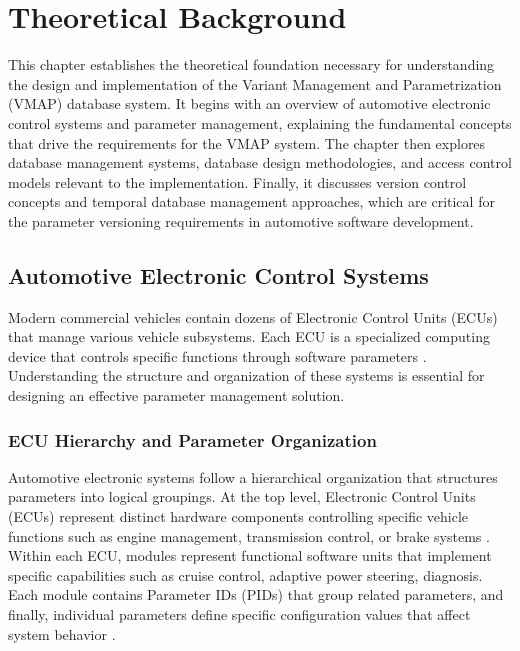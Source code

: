 \chapter{Theoretical Background}
\label{chap:theoretical-background}

This chapter establishes the theoretical foundation necessary for understanding the design and implementation of the Variant Management and Parametrization (VMAP) database system. It begins with an overview of automotive electronic control systems and parameter management, explaining the fundamental concepts that drive the requirements for the VMAP system. The chapter then explores database management systems, database design methodologies, and access control models relevant to the implementation. Finally, it discusses version control concepts and temporal database management approaches, which are critical for the parameter versioning requirements in automotive software development.

\section{Automotive Electronic Control Systems}
\label{sec:automotive-electronic-systems}

Modern commercial vehicles contain dozens of Electronic Control Units (ECUs) that manage various vehicle subsystems. Each ECU is a specialized computing device that controls specific functions through software parameters \cite{staron2021automotive}. Understanding the structure and organization of these systems is essential for designing an effective parameter management solution.

\subsection{ECU Hierarchy and Parameter Organization}
\label{subsec:ecu-hierarchy}

Automotive electronic systems follow a hierarchical organization that structures parameters into logical groupings. At the top level, Electronic Control Units (ECUs) represent distinct hardware components controlling specific vehicle functions such as engine management, transmission control, or brake systems \cite{kiencke2000automotive}. Within each ECU, modules represent functional software units that implement specific capabilities such as cruise control, adaptive power steering, diagnosis. Each module contains Parameter IDs (PIDs) that group related parameters, and finally, individual parameters define specific configuration values that affect system behavior \cite{staron2021autosar}.

